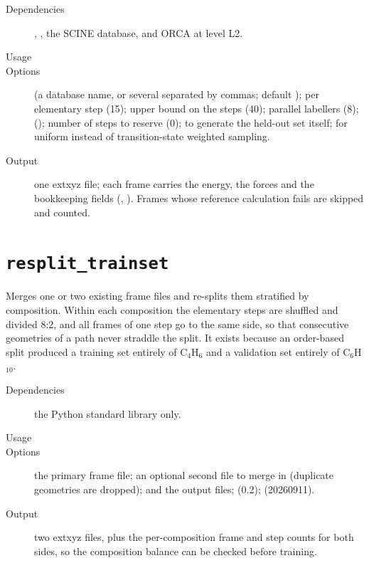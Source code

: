 \begin{description}
  \item[Dependencies] , , the SCINE database, and
        ORCA at level L2.
  \item[Usage] 
  \item[Options]  (a database name, or several separated by
        commas; default );  per
        elementary step (15);  upper bound on the steps
        (40);  parallel labellers (8); 
        ();  number of steps
        to reserve (0);  to generate the held-out set
        itself;  for uniform instead of transition-state
        weighted sampling.
  \item[Output] one extxyz file; each frame carries the energy, the forces
        and the bookkeeping fields (, ).  Frames whose
        reference calculation fails are skipped and counted.
\end{description}

\section{\texttt{resplit\_trainset}}

Merges one or two existing frame files and re-splits them stratified by
composition.  Within each composition the elementary steps are shuffled and
divided 8:2, and all frames of one step go to the same side, so that
consecutive geometries of a path never straddle the split.  It exists because
an order-based split produced a training set entirely of C$_4$H$_6$ and a
validation set entirely of C$_6$H$_{10}$.

\begin{description}
  \item[Dependencies] the Python standard library only.
  \item[Usage] 
  \item[Options]  the primary frame file;  an optional
        second file to merge in (duplicate geometries are dropped);
         and  the output files;
         (0.2);  (20260911).
  \item[Output] two extxyz files, plus the per-composition frame and step
        counts for both sides, so the composition balance can be checked
        before training.
\end{description}


